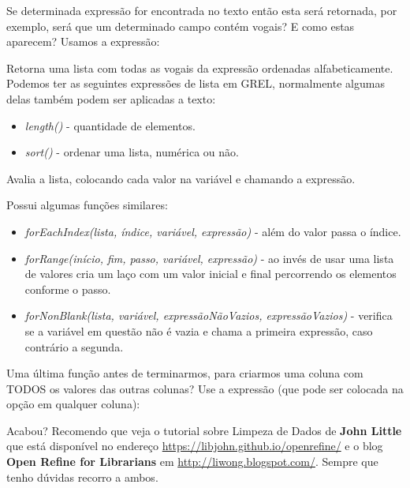 \documentclass[a4paper,11pt]{article}
\begin{document}

Se determinada expressão for encontrada no texto então esta será retornada, por exemplo, será que um determinado campo contém vogais? E como estas aparecem? Usamos a expressão: \\

Retorna uma lista com todas as vogais da expressão ordenadas alfabeticamente. Podemos ter as seguintes expressões de lista em GREL, normalmente algumas delas também podem ser aplicadas a texto:
\begin{itemize}[nolistsep]
	\item \textit{length()} - quantidade de elementos.
	\item \textit{sort()} - ordenar uma lista, numérica ou não.
\end{itemize}

	
Avalia a lista, colocando cada valor na variável e chamando a expressão.

Possui algumas funções similares:
\begin{itemize}[nolistsep]
	\item \textit{forEachIndex(lista, índice, variável, expressão)} - além do valor passa o índice.
	\item \textit{forRange(início, fim, passo, variável, expressão)} - ao invés de usar uma lista de valores cria um laço com um valor inicial e final percorrendo os elementos conforme o passo.
	\item \textit{forNonBlank(lista, variável, expressãoNãoVazios, expressãoVazios)} - verifica se a variável em questão não é vazia e chama a primeira expressão, caso contrário a segunda.
\end{itemize}

Uma última função antes de terminarmos, para criarmos uma coluna com TODOS os valores das outras colunas? Use a expressão (que pode ser colocada na opção  em qualquer coluna): \\

Acabou? Recomendo que veja o tutorial sobre Limpeza de Dados de \textbf{John Little} que está disponível no endereço \url{https://libjohn.github.io/openrefine/} e o blog \textbf{Open Refine for Librarians} em \url{http://liwong.blogspot.com/}. Sempre que tenho dúvidas recorro a ambos.
	
\end{document}
